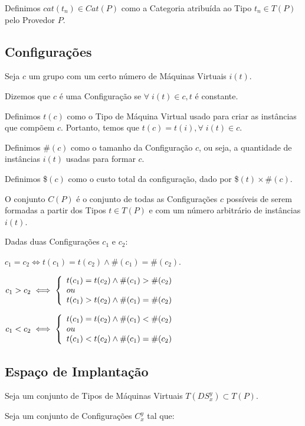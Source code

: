 Definimos $cat(t_n) \in Cat(P)$ como a Categoria atribuída ao Tipo $t_n \in T(P)$ 
pelo Provedor $P$.

\subsection{Configurações}
\label{sec:formalizacao_configuracoes}
Seja $c$ um grupo com um certo número de Máquinas Virtuais $i(t)$.

Dizemos que $c$ é uma Configuração se $\forall \; i(t) \in c, t$ é constante.

Definimos $t(c)$ como o Tipo de Máquina Virtual usado para criar as instâncias 
que compõem $c$. Portanto, temos que $t(c) = t(i), \forall \; i(t) \in c$. 

Definimos $\#(c)$ como o tamanho da Configuração $c$, ou seja, a quantidade de 
instâncias $i(t)$ usadas para formar $c$.

Definimos \$$(c)$ como o custo total da configuração, dado por \$$(t) \times \#(c)$.

O conjunto $C(P)$ é o conjunto de todas as Configurações $c$ possíveis de serem 
formadas a partir dos Tipos $t \in T(P)$ e com um número arbitrário de instâncias 
$i(t)$.

Dadas duas Configurações $c_1$ e $c_2$:

$c_1 = c_2 \iff t(c_1) = t(c_2) \land \#(c_1) = \#(c_2)$.

$ c_1 > c_2 \iff \left\{
  \begin{array}{l l}
    t(c_1) = t(c_2) \land \#(c_1) > \#(c_2)\\
    ou\\
    t(c_1) > t(c_2) \land \#(c_1) = \#(c_2)
  \end{array} \right.$
  
$ c_1 < c_2 \iff \left\{
  \begin{array}{l l}
    t(c_1) = t(c_2) \land \#(c_1) < \#(c_2)\\
    ou\\
    t(c_1) < t(c_2) \land \#(c_1) = \#(c_2)
  \end{array} \right.$

\subsection{Espaço de Implantação}
Seja um conjunto de Tipos de Máquinas Virtuais $T(DS_x^y) \subset T(P)$.

Seja um conjunto de Configurações $C_x^y$ tal que:
 
